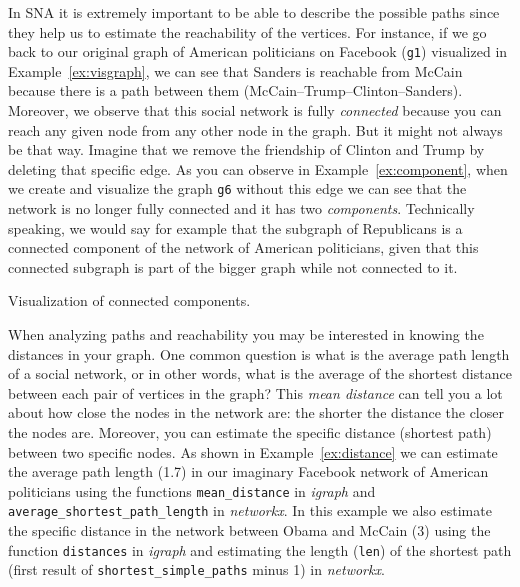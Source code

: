 In SNA it is extremely important to be able to describe the possible paths since they help us to estimate the reachability of the vertices. For instance, if we go back to our original graph of American politicians on Facebook (\texttt{g1}) visualized in Example~\ref{ex:visgraph}, we can see that Sanders is reachable from McCain because there is a path between them (McCain--Trump--Clinton--Sanders).  Moreover, we observe that this social network is fully \emph{connected} because you can reach any given node from any other node in the graph. But it might not always be that way. Imagine that we remove the friendship of Clinton and Trump by deleting that specific edge. As you can observe in Example~\ref{ex:component}, when we create and visualize the graph \texttt{g6} without this edge we can see that the network is no longer fully connected and it has two \emph{components}. Technically speaking, we would say for example that the subgraph of Republicans is a connected component of the network of American politicians, given that this connected subgraph is part of the bigger graph while not connected to it.

\begin{ccsexample}
  \caption{Visualization of connected components.}
  \label{ex:component}
\end{ccsexample}

When analyzing paths and reachability you may be interested in knowing the distances in your graph. One common question is what is the average path length of a social network, or in other words, what is the average of the shortest distance between each pair of vertices in the graph? This \emph{mean distance} can tell you a lot about how close the nodes in the network are: the shorter the distance the closer the nodes are. Moreover, you can estimate the specific distance (shortest path) between two specific nodes.  As shown in Example~\ref{ex:distance} we can estimate the average path length (1.7) in our imaginary Facebook network of American politicians using the functions \texttt{mean\_distance} in \emph{igraph} and \texttt{average\_shortest\_path\_length} in \emph{networkx}. In this example we also estimate the specific distance in the network between Obama and McCain (3) using the function \texttt{distances} in \emph{igraph} and estimating the length (\texttt{len}) of the shortest path (first result of \texttt{shortest\_simple\_paths} minus 1) in \emph{networkx}.

